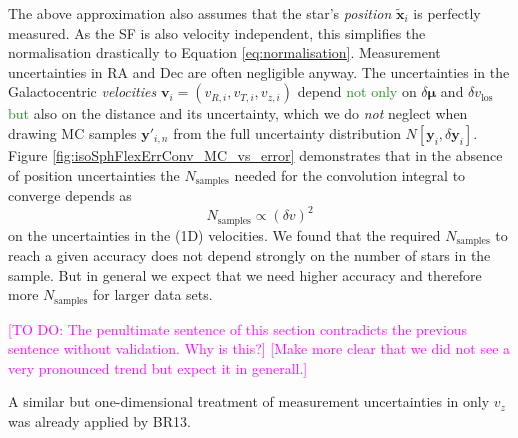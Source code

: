 \documentclass[iop,revtex4]{emulateapj}
\newcommand{\vect}[1]{\boldsymbol{#1}}
\newcommand{\NEW}[1]{\textcolor{ForestGreen}{#1}}
\newcommand{\Wilma}[1]{\textcolor{Magenta}{#1}}
\newcommand{\OLD}[1]{}
\begin{document}
The above approximation also assumes that the star's \emph{position} $\tilde{\vect{x}}_i$ is perfectly measured. As the SF is also velocity independent, this simplifies the normalisation drastically to Equation \eqref{eq:normalisation}. Measurement uncertainties in $\mathrm{RA}$ and $\mathrm{Dec}$ are often negligible anyway. The uncertainties in the Galactocentric \emph{velocities} $\vect{v}_i = (v_{R,i},v_{T,i},v_{z,i})$ depend \OLD{besides}\NEW{not only} on $\delta \vect{\mu}$ and $\delta v_\text{los}$ \NEW{but} also on the distance and its uncertainty, which we do \emph{not} neglect when drawing MC samples $\vect{y}'_{i,n}$ from the full uncertainty distribution $N[\vect{y}_i,\delta \vect{y}_i]$. Figure \ref{fig:isoSphFlexErrConv_MC_vs_error} demonstrates that in the absence of position uncertainties the $N_\text{samples}$ needed for the convolution integral to converge depends as
\begin{equation*}
N_\text{samples} \propto \left( \delta v \right)^2
\end{equation*}
on the uncertainties in the (1D) velocities. We found that the required $N_\text{samples}$ to reach a given accuracy does not depend strongly on the number of stars in the sample. But in general we expect that we need higher accuracy and therefore more $N_\text{samples}$ for larger data sets.

\Wilma{[TO DO: The penultimate sentence of this section contradicts the previous sentence without validation. Why is this?] [Make more clear that we did not see a very pronounced trend but expect it in generall.]}

A similar but one-dimensional treatment of measurement uncertainties in only $v_z$ was already applied by BR13.

\end{document}
